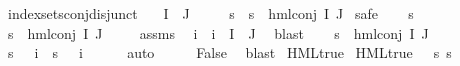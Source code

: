 \begin{isabellebody}
\isanewline
{}\isamarkupfalse%
\ index{\isacharunderscore}{\kern0pt}sets{\isacharunderscore}{\kern0pt}conj{\isacharunderscore}{\kern0pt}disjunct{\isacharcolon}{\kern0pt}\isanewline
\ \ \ {\isachardoublequoteopen}I\ {\isasyminter}\ J\ {\isasymnoteq}\ {\isacharbraceleft}{\kern0pt}{\isacharbraceright}{\kern0pt}{\isachardoublequoteclose}\isanewline
\ \ \ {\isachardoublequoteopen}{\isasymforall}s{\isachardot}{\kern0pt}\ {\isasymnot}\ {\isacharparenleft}{\kern0pt}s\ {\isasymTurnstile}\ {\isacharparenleft}{\kern0pt}hml{\isacharunderscore}{\kern0pt}conj\ I\ J\ {\isasymPhi}{\isacharparenright}{\kern0pt}{\isacharparenright}{\kern0pt}{\isachardoublequoteclose}\isanewline
%
\isadelimproof
%
\endisadelimproof
%
\isatagproof
{}\isamarkupfalse%
{\isacharparenleft}{\kern0pt}safe{\isacharparenright}{\kern0pt}\isanewline
\ \ \isamarkupfalse%
\ s\isanewline
\ \ \isamarkupfalse%
\ {\isachardoublequoteopen}s\ {\isasymTurnstile}\ hml{\isacharunderscore}{\kern0pt}conj\ I\ J\ {\isasymPhi}{\isachardoublequoteclose}\isanewline
\ \ \isamarkupfalse%
\ assms\ \isamarkupfalse%
\ i\ \ {\isachardoublequoteopen}i\ {\isasymin}\ I\ {\isasyminter}\ J{\isachardoublequoteclose}\ \isamarkupfalse%
\ blast\isanewline
\ \ \isamarkupfalse%
\ {\isacartoucheopen}s\ {\isasymTurnstile}\ hml{\isacharunderscore}{\kern0pt}conj\ I\ J\ {\isasymPhi}{\isacartoucheclose}\ \isamarkupfalse%
\ {\isachardoublequoteopen}{\isacharparenleft}{\kern0pt}{\isacharparenleft}{\kern0pt}s\ {\isasymTurnstile}\ {\isacharparenleft}{\kern0pt}{\isasymPhi}\ i{\isacharparenright}{\kern0pt}{\isacharparenright}{\kern0pt}\ {\isasymand}\ {\isacharparenleft}{\kern0pt}{\isasymnot}{\isacharparenleft}{\kern0pt}s\ {\isasymTurnstile}\ {\isacharparenleft}{\kern0pt}{\isasymPhi}\ i{\isacharparenright}{\kern0pt}{\isacharparenright}{\kern0pt}{\isacharparenright}{\kern0pt}{\isacharparenright}{\kern0pt}{\isachardoublequoteclose}\isanewline
\ \ \ \ \isamarkupfalse%
\ auto\isanewline
\ \ \isamarkupfalse%
\ \isamarkupfalse%
\ False\ \isamarkupfalse%
\ blast\isanewline
{}\isamarkupfalse%
%
\endisatagproof
{\isafoldproof}%
%
\isadelimproof
\isanewline
%
\endisadelimproof
\isanewline
{}\isamarkupfalse%
\ HML{\isacharunderscore}{\kern0pt}true\ \isanewline
{\isachardoublequoteopen}HML{\isacharunderscore}{\kern0pt}true\ {\isasymphi}\ {\isasymequiv}\ {\isasymforall}s{\isachardot}{\kern0pt}\ s\ {\isasymTurnstile}\ {\isasymphi}{\isachardoublequoteclose}\isanewline

\end{isabellebody}
